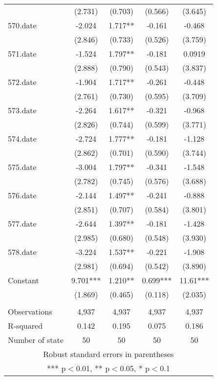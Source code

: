 \documentclass[]{article}
\begin{document}
\begin{tabular}{lcccc}
 & (2.731) & (0.703) & (0.566) & (3.645) \\
570.date & -2.024 & 1.717** & -0.161 & -0.468 \\
 & (2.846) & (0.733) & (0.526) & (3.759) \\
571.date & -1.524 & 1.797** & -0.181 & 0.0919 \\
 & (2.888) & (0.790) & (0.543) & (3.837) \\
572.date & -1.904 & 1.717** & -0.261 & -0.448 \\
 & (2.761) & (0.730) & (0.595) & (3.709) \\
573.date & -2.264 & 1.617** & -0.321 & -0.968 \\
 & (2.826) & (0.744) & (0.599) & (3.771) \\
574.date & -2.724 & 1.777** & -0.181 & -1.128 \\
 & (2.862) & (0.701) & (0.590) & (3.744) \\
575.date & -3.004 & 1.797** & -0.341 & -1.548 \\
 & (2.782) & (0.745) & (0.576) & (3.688) \\
576.date & -2.144 & 1.497** & -0.241 & -0.888 \\
 & (2.851) & (0.707) & (0.584) & (3.801) \\
577.date & -2.644 & 1.397** & -0.181 & -1.428 \\
 & (2.985) & (0.680) & (0.548) & (3.930) \\
578.date & -3.224 & 1.537** & -0.221 & -1.908 \\
 & (2.981) & (0.694) & (0.542) & (3.890) \\
Constant & 9.701*** & 1.210** & 0.699*** & 11.61*** \\
 & (1.869) & (0.465) & (0.118) & (2.035) \\
 &  &  &  &  \\
Observations & 4,937 & 4,937 & 4,937 & 4,937 \\
R-squared & 0.142 & 0.195 & 0.075 & 0.186 \\
 Number of state & 50 & 50 & 50 & 50 \\ \hline
\multicolumn{5}{c}{ Robust standard errors in parentheses} \\
\multicolumn{5}{c}{ *** p$<$0.01, ** p$<$0.05, * p$<$0.1} \\
\end{tabular}
\end{document}

